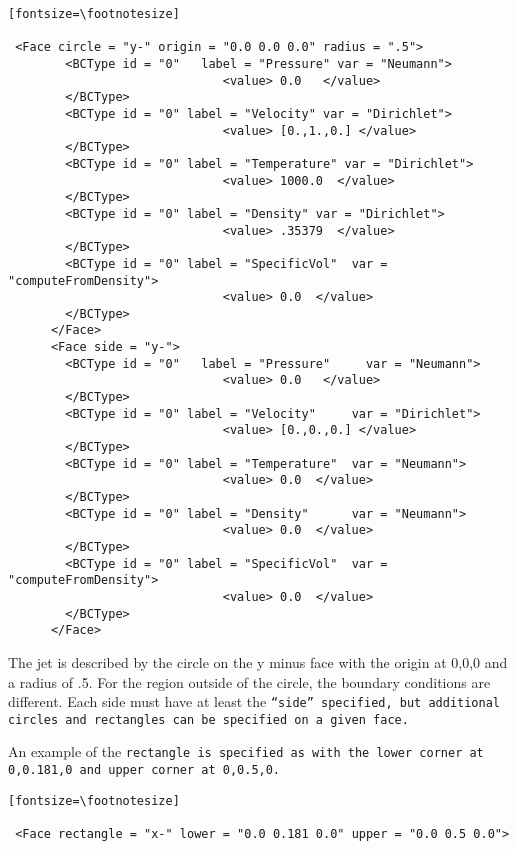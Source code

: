 \begin{verbatim}[fontsize=\footnotesize]

 <Face circle = "y-" origin = "0.0 0.0 0.0" radius = ".5">
        <BCType id = "0"   label = "Pressure" var = "Neumann">
                              <value> 0.0   </value>
        </BCType>
        <BCType id = "0" label = "Velocity" var = "Dirichlet">
                              <value> [0.,1.,0.] </value>
        </BCType>
        <BCType id = "0" label = "Temperature" var = "Dirichlet">
                              <value> 1000.0  </value>
        </BCType>
        <BCType id = "0" label = "Density" var = "Dirichlet">
                              <value> .35379  </value>
        </BCType>
        <BCType id = "0" label = "SpecificVol"  var = "computeFromDensity">
                              <value> 0.0  </value>
        </BCType>
      </Face>
      <Face side = "y-">
        <BCType id = "0"   label = "Pressure"     var = "Neumann">
                              <value> 0.0   </value>
        </BCType>
        <BCType id = "0" label = "Velocity"     var = "Dirichlet">
                              <value> [0.,0.,0.] </value>
        </BCType>
        <BCType id = "0" label = "Temperature"  var = "Neumann">
                              <value> 0.0  </value>
        </BCType>
        <BCType id = "0" label = "Density"      var = "Neumann">
                              <value> 0.0  </value>
        </BCType>
        <BCType id = "0" label = "SpecificVol"  var = "computeFromDensity">
                              <value> 0.0  </value>
        </BCType>
      </Face>

\end{verbatim}

The jet is described by the circle on the y minus face with the origin
at 0,0,0 and a radius of .5.  For the region outside of the circle,
the boundary conditions are different.  Each side must have at least
the \tt ``side'' \normalfont specified, but additional circles and
rectangles can be specified on a given face.

An example of the \tt rectangle \normalfont is specified as with the
lower corner at 0,0.181,0 and upper corner at 0,0.5,0.


\begin{verbatim}[fontsize=\footnotesize]

 <Face rectangle = "x-" lower = "0.0 0.181 0.0" upper = "0.0 0.5 0.0">

\end{verbatim}


